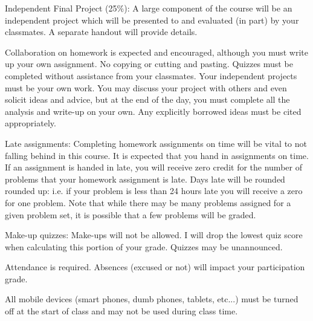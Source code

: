 \documentclass[10pt]{article}
\begin{document}
\noindent Independent Final Project (25\%): A large component of the course will be an independent project which will be presented to and evaluated (in part) by your classmates. A separate handout will provide details. 


\bigskip
{}

Collaboration on homework is expected and encouraged, although you must write up your own assignment. No copying or cutting and pasting. Quizzes must be completed without assistance from your classmates. Your independent projects must be your own work. You may discuss your project with others and even solicit ideas and advice, but at the end of the day, you must complete all the analysis and write-up on your own. Any explicitly borrowed ideas must be cited appropriately.

Late assignments: Completing homework assignments on time will be vital to not falling behind in this course. It is expected that you hand in assignments on time. If an assignment is handed in late, you will receive zero credit for the number of problems that your homework assignment is late. Days late will be rounded rounded up: i.e. if your problem is less than 24 hours late you will receive a zero for one problem. Note that while there may be many problems assigned for a given problem set, it is possible that a few problems will be graded.  

Make-up quizzes: Make-ups will not be allowed. I will drop the lowest quiz score when calculating this portion of your grade. Quizzes may be unannounced.

Attendance is required. Absences (excused or not) will impact your participation grade.

All mobile devices (smart phones, dumb phones, tablets, etc...) must be turned off at the start of class and may not be used during class time.
  
\end{document}
